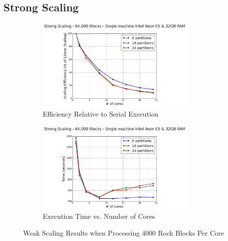 \subsection{Strong Scaling}
\begin{figure}[t]
\centering
\begin{subfigure}{0.5\textwidth}
    \centering
    \includegraphics[width=0.85\textwidth]{strongScalingEfficiency.png}
    \caption{Efficiency Relative to Serial Execution}
\end{subfigure}%
\begin{subfigure}{0.5\textwidth}
    \centering
    \includegraphics[width=0.85\textwidth]{strongScalingTime.png}
    \caption{Execution Time vs. Number of Cores}
\end{subfigure}
\caption{Weak Scaling Results when Processing 4000 Rock Blocks Per Core}
\label{fig:strongScaling}
\end{figure}

